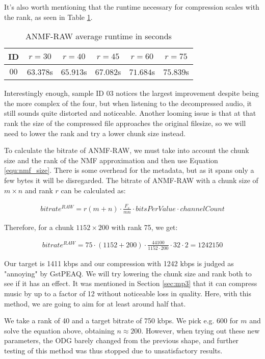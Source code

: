 It's also worth mentioning that the runtime necessary for compression scales with the rank, as seen in Table \ref{tab:anmf_raw_runtime}.

\begin{table}[htbp]\caption{ANMF-RAW average runtime in seconds}
	\label{tab:anmf_raw_runtime}
	\centering
	\begin{tabular}{|c|c|c|c|c|c|}
		\hline
		ID & $r=30$ & $r=40$ & $r=45$ & $r=60$ & $r=75$ \\ \hline
		$00$ & $63.378$s & $65.913$s & $67.082$s & $71.684$s & $75.839$s \\	
		\hline
	\end{tabular}
\end{table}

Interestingly enough, sample ID 03 notices the largest improvement despite being the more complex of the four, but when listening to the decompressed audio, it still sounds quite distorted and noticeable. Another looming issue is that at that rank the size of the compressed file approaches the original filesize, so we will need to lower the rank and try a lower chunk size instead.

To calculate the bitrate of ANMF-RAW, we must take into account the chunk size and the rank of the NMF approximation and then use Equation \ref{equ:nmf_size}. There is some overhead for the metadata, but as it spans only a few bytes it will be disregarded. The bitrate of ANMF-RAW with a chunk size of $m \times n$ and rank $r$ can be calculated as:

\begin{align}
bitrate^{RAW} = r(m+n) \cdot \frac{F_s}{mn} \cdot bitsPerValue \cdot channelCount
\end{align}

Therefore, for a chunk $1152 \times 200$ with rank 75, we get:

\begin{align}
bitrate^{RAW} = 75 \cdot (1152 + 200) \cdot \frac{44100}{1152 \cdot 200} \cdot 32 \cdot 2 = 1242150
\end{align}

Our target is 1411 kbps and our compression with 1242 kbps is judged as "annoying" by GstPEAQ. We will try lowering the chunk size and rank both to see if it has an effect. It was mentioned in Section \ref{sec:mp3} that it can compress music by up to a factor of 12 without noticeable loss in quality. Here, with this method, we are going to aim for at least around half that.

We take a rank of 40 and a target bitrate of 750 kbps. We pick e.g. $600$ for $m$ and solve the equation above, obtaining $n \approx 200$. However, when trying out these new parameters, the ODG barely changed from the previous shape, and further testing of this method was thus stopped due to unsatisfactory results.

